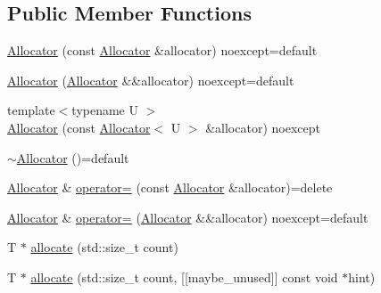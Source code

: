 \subsection*{Public Member Functions}
\begin{DoxyCompactItemize}
\item 
\mbox{\hyperlink{classmage_1_1_single_ended_memory_stack_1_1_allocator_abcbc435ff81182693d19aef11e6b4983}{Allocator}} (const \mbox{\hyperlink{classmage_1_1_single_ended_memory_stack_1_1_allocator}{Allocator}} \&allocator) noexcept=default
\item 
\mbox{\hyperlink{classmage_1_1_single_ended_memory_stack_1_1_allocator_a7d913b8b1a6b56a1f2dc06aba91e929c}{Allocator}} (\mbox{\hyperlink{classmage_1_1_single_ended_memory_stack_1_1_allocator}{Allocator}} \&\&allocator) noexcept=default
\item 
{\footnotesize template$<$typename U $>$ }\\\mbox{\hyperlink{classmage_1_1_single_ended_memory_stack_1_1_allocator_a6fd265441059b0d5bd6defbaaf5b1368}{Allocator}} (const \mbox{\hyperlink{classmage_1_1_single_ended_memory_stack_1_1_allocator}{Allocator}}$<$ U $>$ \&allocator) noexcept
\item 
\mbox{\hyperlink{classmage_1_1_single_ended_memory_stack_1_1_allocator_a529274874ef0d44bf9ffcb18c6f20f0b}{$\sim$\+Allocator}} ()=default
\item 
\mbox{\hyperlink{classmage_1_1_single_ended_memory_stack_1_1_allocator}{Allocator}} \& \mbox{\hyperlink{classmage_1_1_single_ended_memory_stack_1_1_allocator_aa124f846e082080f12330255ffb3d360}{operator=}} (const \mbox{\hyperlink{classmage_1_1_single_ended_memory_stack_1_1_allocator}{Allocator}} \&allocator)=delete
\item 
\mbox{\hyperlink{classmage_1_1_single_ended_memory_stack_1_1_allocator}{Allocator}} \& \mbox{\hyperlink{classmage_1_1_single_ended_memory_stack_1_1_allocator_a0d5de467c96969b4c0d645bdc7b398db}{operator=}} (\mbox{\hyperlink{classmage_1_1_single_ended_memory_stack_1_1_allocator}{Allocator}} \&\&allocator) noexcept=default
\item 
T $\ast$ \mbox{\hyperlink{classmage_1_1_single_ended_memory_stack_1_1_allocator_a4fde02dc87017337b3c670147a606427}{allocate}} (std\+::size\+\_\+t count)
\item 
T $\ast$ \mbox{\hyperlink{classmage_1_1_single_ended_memory_stack_1_1_allocator_a7104725b8d2a183257ec3dc7a9c6601a}{allocate}} (std\+::size\+\_\+t count, \mbox{[}\mbox{[}maybe\+\_\+unused\mbox{]}\mbox{]} const void $\ast$hint)
\item 

\end{DoxyCompactItemize}
